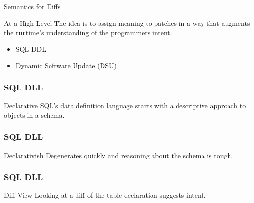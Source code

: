 \documentclass{beamer}
\begin{document}
\begin{frame}{Semantics for Diffs}
  \begin{block}{At a High Level}
    The idea is to assign meaning to patches in a way that augments the runtime's understanding of the programmers intent.

    \begin{itemize}
      \item SQL DDL
      \item Dynamic Software Update (DSU)
    \end{itemize}
  \end{block}
\end{frame}

\begin{frame}[fragile]
  \frametitle{SQL DLL}
  \begin{block}{Declarative}
    SQL's data definition language starts with a descriptive approach to objects in a schema.
  \end{block}

  \begin{example}
    
  \end{example}
\end{frame}

\begin{frame}[fragile]
  \frametitle{SQL DLL}
  \begin{block}{Declarativish}
    Degenerates quickly and reasoning about the schema is tough.
  \end{block}

  \begin{example}
    
  \end{example}
\end{frame}

\begin{frame}[fragile]
  \frametitle{SQL DLL}
  \begin{block}{Diff View}
    Looking at a diff of the table declaration suggests intent.
  \end{block}

  \begin{example}
    \begin{center}
      \begin{minipage}{.44\textwidth}
        
      \end{minipage}
      \hfill
      \begin{minipage}{.48\textwidth}
        
      \end{minipage}
    \end{center}
  \end{example}
\end{frame}
\end{document}
